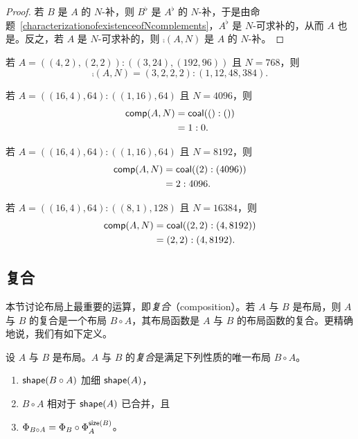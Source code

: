 \begin{proof}
若 $B$ 是 $A$ 的 $N$-补，则 $B^\flat$ 是 $A^\flat$ 的 $N$-补，于是由命题~\ref{characterizationofexistenceofNcomplements}，$A^\flat$ 是 $N$-可求补的，从而 $A$ 也是。反之，若 $A$ 是 $N$-可求补的，则 $\comp(A,N)$ 是 $A$ 的 $N$-补。
\end{proof}



\begin{example}
若 $A = ((4,2),(2,2)) : ((3,24),(192,96)) $ 且 $N = 768$，则
\[\comp(A,N) = (3,2,2,2):(1,12,48,384).\]
\end{example}

\begin{example}
    若 $A = ((16,4),64):((1,16),64)$ 且 $N = 4096$，则
    \begin{align*}
    \mathsf{comp}(A,N) & = \mathsf{coal}(():()) \\
    & = 1:0.
    \end{align*}
\end{example}

\begin{example}
        若 $A = ((16,4),64):((1,16),64)$ 且 $N = 8192$，则
    \begin{align*}
    \mathsf{comp}(A,N) & = \mathsf{coal}((2):(4096)) \\
    & = 2:4096.
    \end{align*}
\end{example}

\begin{example}
    若 $A = ((16,4),64):((8,1),128)$ 且 $N = 16384$，则
    \begin{align*}
    \mathsf{comp}(A,N) & = \mathsf{coal}((2,2):(4,8192)) \\
    & = (2,2):(4,8192).
    \end{align*}
\end{example}


\subsection{复合}

本节讨论布局上最重要的运算，即{\it 复合}（composition）。若 $A$ 与 $B$ 是布局，则 $A$ 与 $B$ 的复合是一个布局 $B \circ A$，其布局函数是 $A$ 与 $B$ 的布局函数的复合。更精确地说，我们有如下定义。

\begin{definition}[布局的复合]\label{definitionoflayoutcomposition}
    设 $A$ 与 $B$ 是布局。$A$ 与 $B$ 的{\it 复合}是满足下列性质的唯一布局 $B \circ A$。
    \begin{enumerate}
    \item $\mathsf{shape}(B\circ A)$ 加细 $\mathsf{shape}(A)$，
    \item $B \circ A$ 相对于 $\mathsf{shape}(A)$ 已合并，且
    \item $\Phi_{B \circ A} = \Phi_B \circ \Phi_A^{\mathsf{size}(B)}$。
    \end{enumerate}
\end{definition}

